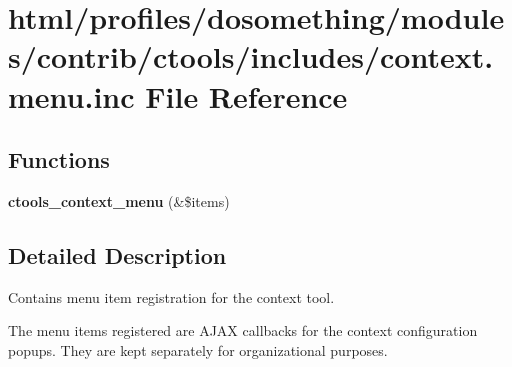 \hypertarget{context_8menu_8inc}{
\section{html/profiles/dosomething/modules/contrib/ctools/includes/context.menu.inc File Reference}
\label{context_8menu_8inc}
}
\subsection*{Functions}
\begin{DoxyCompactItemize}
\item 
\hypertarget{context_8menu_8inc_aaf7b05f0540e6a6d77b57f9f201a9e0d}{
{\bfseries ctools\_\-context\_\-menu} (\&\$items)}
\label{context_8menu_8inc_aaf7b05f0540e6a6d77b57f9f201a9e0d}

\end{DoxyCompactItemize}


\subsection{Detailed Description}
Contains menu item registration for the context tool.

The menu items registered are AJAX callbacks for the context configuration popups. They are kept separately for organizational purposes. 